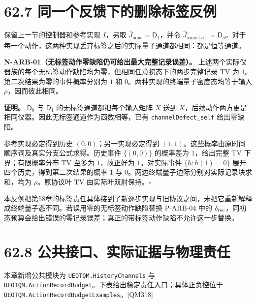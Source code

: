 \documentclass[
  11pt,
  oneside]{book}
\begin{document}
\section{62.7 同一个反馈下的删除标签反例}

保留上一节的控制器和参考实现 \(I\)，另取
\(\widehat J_{\mathrm{none}}=\mathsf D_1\)，并令
\(\widehat J_{\mathrm{some}(o)}=\mathsf D_o\)。对于每一个动作，这两种实现丢弃标签之后的实际量子通道都相同：都是恒等通道。

\protect\hypertarget{n-arb-01}{}{}

\textbf{N-ARB-01（无标签动作零缺陷仍可给出最大完整记录误差）。}
上述两个实际仪器族的每个无标签动作缺陷均为零，但相同任意初态下的两步完整记录
TV 为 \(1\)。第二次结果为零的事件概率分别为 \(1\) 和
\(0\)。两种实现的终端量子密度态均等于输入 \(\rho\)，因而彼此相同。

\textbf{证明。} \(\mathsf D_0\) 与 \(\mathsf D_1\)
的无标签通道都把每个输入矩阵 \(X\) 送到
\(X\)，后续动作两方更是相同仪器。因此无标签通道作为函数相等，已有
\texttt{channel\allowbreak Defect\_\allowbreak self} 给出零缺陷。

参考实现必定得到历史 \((0,0)\)；另一实现必定得到
\((1,1)\)。这些概率由原时间顺序词及真实分支公式求得。历史事件
\(\{(0,0)\}\) 的概率差为 \(1\)，给出完整 TV 下界；有限概率分布 TV 至多为
\(1\)，故正好为 \(1\)。对实际事件 \(\{h:h(1)=0\}\)
展开四个历史，得到第二次结果的概率 \(1\) 与
\(0\)。两边终端量子边际分别对实际记录块求和，均为 \(\rho\)。原协议叶 TV
由实际叶双射保持。\(\square\)

本反例把第58章的标签责任具体接到了新逐步实现与旧协议之间，未把它重新解释成终端量子态不同。若误用零的无标签动作缺陷替换
P-ARB-04 中的
\(\delta_{\rm rec}\)，同初态预算会给出错误的零记录误差；真正的带标签动作缺陷不允许这一步替换。

\section{62.8 公共接口、实际证据与物理责任}

本章新增公共模块为 \texttt{UEOTQM.\allowbreak History\allowbreak Channels} 与
\texttt{UEOTQM.\allowbreak Action\allowbreak Record\allowbreak Budget}。下表给出稳定责任入口；具体正负控位于
\texttt{UEOTQM.\allowbreak Action\allowbreak Record\allowbreak Budget\allowbreak Examples}。{[}QM318{]}
\end{document}
